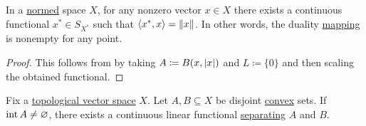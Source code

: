 \begin{corollary}\label{thm:hahn_banach_implies_duality_mapping_nonempty}
  In a \hyperref[def:norm]{normed} space \( X \), for any nonzero vector \( x \in X \) there exists a continuous functional \( x^* \in S_{X^*} \) such that \( \left\langle x^*, x \right\rangle = \left\Vert x \right\Vert \). In other words, the duality \hyperref[def:duality_mapping]{mapping} is nonempty for any point.
\end{corollary}
\begin{proof}
  This follows from  by taking \( A \coloneqq B(x, \left\vert x \right\vert) \) and \( L \coloneqq \{ 0 \} \) and then scaling the obtained functional.
\end{proof}

\begin{theorem}\label{thm:hahn_banach_hyperplane_separation}
  Fix a \hyperref[def:topological_vector_space]{topological vector space} \( X \). Let \( A, B \subseteq X \) be disjoint \hyperref[def:convex_set]{convex} sets. If \( \operatorname{int}{A} \neq \varnothing \), there exists a continuous linear functional \hyperref[def:hyperplane_separation]{separating} \( A \) and \( B \).
\end{theorem}

